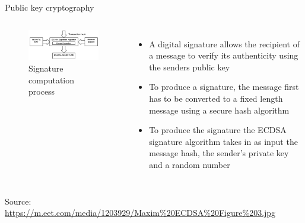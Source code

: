 \documentclass[11pt]{beamer}
\begin{document}
\begin{frame}{Public key cryptography}
	\begin{columns}
		\begin{figure}[]
			\centering
			\includegraphics  [scale=0.4]{Images/ECDSA1}
			\caption{Signature computation process}
		\end{figure}
		\begin{itemize}
			\item A digital signature allows the recipient of a message to verify its authenticity using the senders public key
			\item To produce a signature, the message first has to be converted to a fixed length message using a secure hash algorithm
			\item To produce the signature the ECDSA signature algorithm takes in as input the message hash, the sender's private key and a random number
		\end{itemize}
	\end{columns}
	\begin{tiny}
		Source: \href{https://eng.paxos.com/blockchain-separating-hype-from-substance-part-2}{https://m.eet.com/media/1203929/Maxim\%20ECDSA\%20Figure\%203.jpg}
	\end{tiny}
\end{frame}



\end{document}
